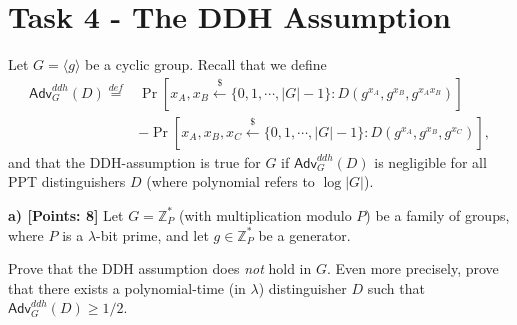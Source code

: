 \documentclass[12pt]{article}
\newcommand{\eqdef}{\stackrel{def}{=}}
\newcommand{\Z}{\mathbb{Z}}
\newcommand{\getsr}{\stackrel{\$}{\gets}}
\newcommand{\angles}[1]{\langle #1 \rangle}
\newcommand{\Adv}{\textsf{Adv}}
\theoremstyle{definition}
\begin{document}
\section{Task 4 - The DDH Assumption}
Let $G = \angles{g}$ be a cyclic group. Recall that we define
$$\begin{aligned}
\Adv_G^{ddh}(D) \eqdef & \Pr[x_A, x_B \getsr \{0, 1, \cdots, |G|-1\} : D(g^{x_A}, g^{x_B}, g^{x_Ax_B})] \\
&- \Pr[x_A, x_B, x_C \getsr \{0, 1, \cdots, |G|-1\} : D(g^{x_A}, g^{x_B}, g^{x_C})],
\end{aligned}$$
and that the DDH-assumption is true for $G$ if $\Adv_G^{ddh}(D)$ is negligible for all PPT distinguishers $D$ (where polynomial refers to $\log |G|$).

{\bf a) [Points: 8]} Let $G = \Z_P^*$ (with multiplication modulo $P$) be a family of groups, where $P$ is a $\lambda$-bit prime, and let $g \in \Z_P^*$ be a generator.

Prove that the DDH assumption does \emph{not} hold in $G$. Even more precisely, prove that there exists a polynomial-time (in $\lambda$) distinguisher $D$ such that $\Adv_G^{ddh}(D) \geq 1/2$.
\end{document}

